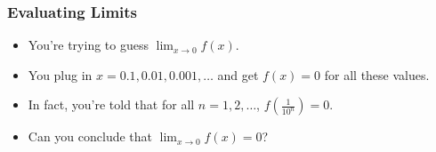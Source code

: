 \documentclass[14pt]{beamer}
\newcommand {\DS} [1] {${\displaystyle #1}$}
\begin{document}
\begin{frame}
\frametitle{Evaluating Limits}

\begin{itemize}
	\item You're trying to guess $\displaystyle{\lim_{x \rightarrow 0}
f(x)}$. 

	\item You plug in $x=0.1, 0.01, 0.001, \dots$ and get $f(x)=0$ for
all these values. 

\item In fact, you're told that for all $n=1, 2, \dots$,
$\displaystyle{f\left(\frac{1}{10^n}\right)}=0$. \\

\item Can you conclude that \DS{\lim_{x \rightarrow 0}
f(x)=0}?
\end{itemize}

\end{frame}
\end{document}
